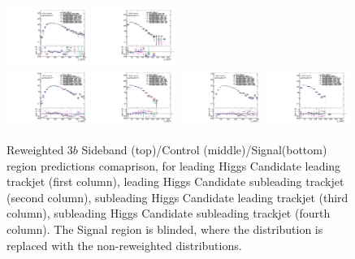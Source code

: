 \begin{figure}[htbp!]
\begin{center}
\includegraphics[width=0.24\textwidth,angle=-90]{figures/boosted/AppendixReweight/Compare/Data_ThreeTag_Control_directcompare_sublHCand_trk0_Pt_1.pdf}
\includegraphics[width=0.24\textwidth,angle=-90]{figures/boosted/AppendixReweight/Compare/Data_ThreeTag_Control_directcompare_sublHCand_trk1_Pt_1.pdf}\\
\includegraphics[width=0.24\textwidth,angle=-90]{figures/boosted/AppendixReweight/Compare/Data_ThreeTag_Signal_directcompare_leadHCand_trk0_Pt_1.pdf}
\includegraphics[width=0.24\textwidth,angle=-90]{figures/boosted/AppendixReweight/Compare/Data_ThreeTag_Signal_directcompare_leadHCand_trk1_Pt_1.pdf}
\includegraphics[width=0.24\textwidth,angle=-90]{figures/boosted/AppendixReweight/Compare/Data_ThreeTag_Signal_directcompare_sublHCand_trk0_Pt_1.pdf}
\includegraphics[width=0.24\textwidth,angle=-90]{figures/boosted/AppendixReweight/Compare/Data_ThreeTag_Signal_directcompare_sublHCand_trk1_Pt_1.pdf}\\
\caption{Reweighted 3$b$ Sideband (top)/Control (middle)/Signal(bottom) region predictions comaprison, for leading Higgs Candidate leading trackjet \pt (first column),  leading Higgs Candidate subleading trackjet \pt (second column), subleading Higgs Candidate leading trackjet \pt (third column), subleading Higgs Candidate subleading trackjet \pt (fourth column). The Signal region is blinded, where the distribution is replaced with the non-reweighted distributions.}
\label{fig:app-rw-comp-3b-trkjet}
\end{center}
\end{figure}


